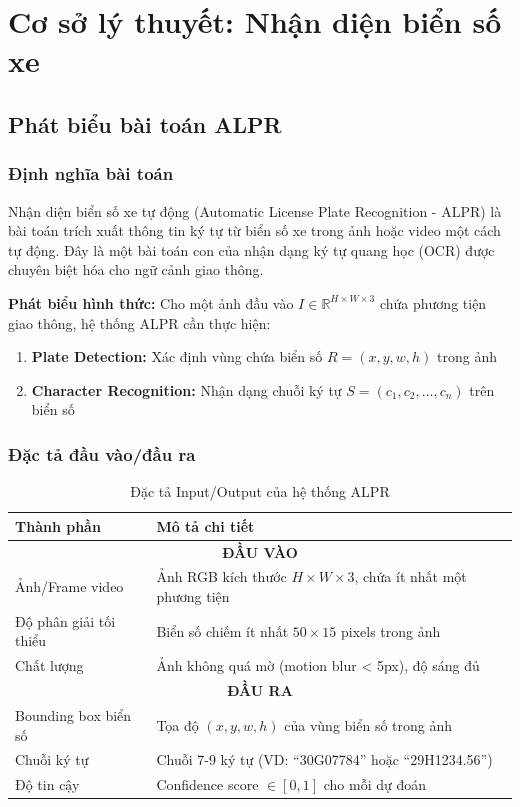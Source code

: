 \chapter{Cơ sở lý thuyết: Nhận diện biển số xe}
\label{ch:ly_thuyet_alpr}

\section{Phát biểu bài toán ALPR}

\subsection{Định nghĩa bài toán}
Nhận diện biển số xe tự động (Automatic License Plate Recognition - ALPR) là bài toán trích xuất thông tin ký tự từ biển số xe trong ảnh hoặc video một cách tự động. Đây là một bài toán con của nhận dạng ký tự quang học (OCR) được chuyên biệt hóa cho ngữ cảnh giao thông.

\textbf{Phát biểu hình thức:} Cho một ảnh đầu vào $I \in \mathbb{R}^{H \times W \times 3}$ chứa phương tiện giao thông, hệ thống ALPR cần thực hiện:
\begin{enumerate}
    \item \textbf{Plate Detection:} Xác định vùng chứa biển số $R = (x, y, w, h)$ trong ảnh
    \item \textbf{Character Recognition:} Nhận dạng chuỗi ký tự $S = (c_1, c_2, \dots, c_n)$ trên biển số
\end{enumerate}

\subsection{Đặc tả đầu vào/đầu ra}

\begin{table}[!ht]
\centering
\caption{Đặc tả Input/Output của hệ thống ALPR}
\label{tab:alpr_io_spec}
\begin{tabular}{|l|p{10cm}|}
\hline
\textbf{Thành phần} & \textbf{Mô tả chi tiết} \\ \hline
\multicolumn{2}{|c|}{\textbf{ĐẦU VÀO}} \\ \hline
Ảnh/Frame video & Ảnh RGB kích thước $H \times W \times 3$, chứa ít nhất một phương tiện \\ \hline
Độ phân giải tối thiểu & Biển số chiếm ít nhất $50 \times 15$ pixels trong ảnh \\ \hline
Chất lượng & Ảnh không quá mờ (motion blur < 5px), độ sáng đủ \\ \hline
\multicolumn{2}{|c|}{\textbf{ĐẦU RA}} \\ \hline
Bounding box biển số & Tọa độ $(x, y, w, h)$ của vùng biển số trong ảnh \\ \hline
Chuỗi ký tự & Chuỗi 7-9 ký tự (VD: ``30G07784'' hoặc ``29H1234.56'') \\ \hline
Độ tin cậy & Confidence score $\in [0, 1]$ cho mỗi dự đoán \\ \hline
\end{tabular}
\end{table}

